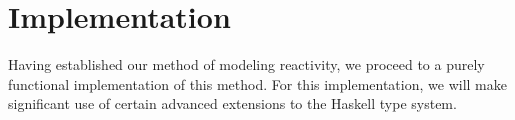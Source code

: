 \chapter{Implementation}
\label{chapter:Implemenation}

Having established our method of modeling reactivity, we proceed to a purely 
functional implementation of this method. For this implementation, we will make
significant use of certain advanced extensions to the Haskell type system.